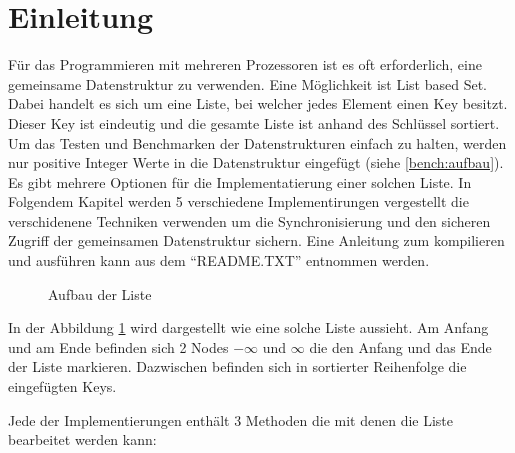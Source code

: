 \documentclass[10pt,a4paper,titlepage,oneside]{article}
\begin{document}
 

\maketitle  
 
\tableofcontents
\newpage  
\section{Einleitung}
Für das Programmieren mit mehreren Prozessoren ist es oft erforderlich, eine gemeinsame Datenstruktur zu verwenden. 
Eine Möglichkeit ist List based Set. Dabei handelt es sich um eine Liste, bei welcher jedes Element einen Key besitzt.
Dieser Key ist eindeutig und die gesamte Liste ist anhand des Schlüssel sortiert. 
Um das Testen und Benchmarken der Datenstrukturen einfach zu halten, werden nur positive Integer Werte in die Datenstruktur eingefügt (siehe \ref{bench:aufbau}). 
Es gibt mehrere Optionen für die Implementatierung einer solchen Liste. In Folgendem Kapitel werden 5 verschiedene Implementirungen vergestellt die verschidenene 
Techniken verwenden um die Synchronisierung und den sicheren Zugriff der gemeinsamen Datenstruktur sichern. Eine Anleitung zum kompilieren und ausführen kann
aus dem ``README.TXT'' entnommen werden.

\begin{figure}[H]
	\centering 
	\caption{Aufbau der Liste}
	\label{tik:list}
\end{figure}

In der Abbildung \ref{tik:list} wird dargestellt wie eine solche Liste aussieht. Am Anfang und am Ende befinden sich 2 Nodes $-\infty$ und $\infty$ die den 
Anfang und das Ende der Liste markieren. Dazwischen befinden sich in sortierter Reihenfolge die eingefügten Keys.

Jede der Implementierungen enthält 3 Methoden die mit denen die Liste bearbeitet werden kann:
\end{document}
